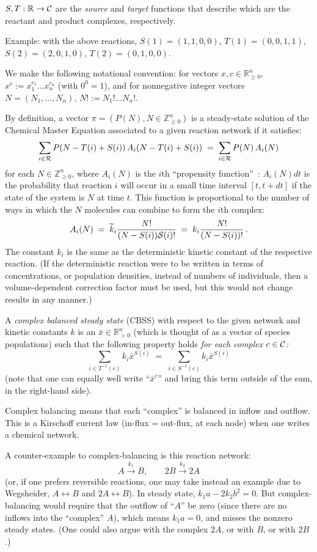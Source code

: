 \documentclass[11pt]{article}
\newcommand{\be}[1]{\begin{equation}\label{#1}}
\newcommand{\ee}{\end{equation}}
\newcommand{\arrowchem}[1]{\xrightarrow{#1}}
\newcommand{\R}{{\mathbb R}}  %
\newcommand{\Z}{{\mathbb Z}}  %
\begin{document}
$S,T: \R\rightarrow {\cal C}$ are the \emph{source} and \emph{target} functions that describe
which are the reactant and product complexes, respectively.

Example: with the above reactions, 
$S(1)=(1,1,0,0)$,
$T(1)=(0,0,1,1)$,
$S(2)=(2,0,1,0)$,
$T(2)=(0,1,0,0)$.

We make the following notational convention:
for vectors $x,c\in \R^n_{\geq 0}$, $x^c:=x_1^{c_1}\ldots x_n^{c_n}$
(with $0^0=1$), and for nonnegative integer vectors
$N=(N_1,\ldots ,N_n)$, $N!:=N_1! \ldots  N_n!$.

By definition, a vector $\pi  = (P(N), N\in \Z_{\geq 0}^n)$ is a steady-state solution
of the Chemical Master Equation associated to a given reaction network
if it satisfies: 
\be{eqn:cme}
\sum_{i\in {\cal R}} P(N-T(i)+S(i)) \,A_i(N-T(i)+S(i))
\;=\;
\sum_{i\in {\cal R}} P(N) \,A_i(N)
\ee
for each $N\in \Z^n_{\geq 0}$,
where $A_i(N)$ is the $i$th ``propensity function''~\cite{gil00}: 
$A_i(N)dt$ is the probability that
reaction $i$ will occur in a small time interval $[t,t+dt]$ if the
state of the system is $N$ at time $t$.
This function is proportional to the number of ways in which the $N$ molecules
can combine to form the $i$th complex:
\[
A_i(N) \;=\; \widetilde k_i \frac{N!}{(N-S(i)){\cal S}(i)!} \;=\;
k_i \frac{N!}{(N-S(i))!} \,.
\]
The constant $k_i$ is the same as the deterministic kinetic constant
of the respective reaction.
(If the deterministic reaction were to be written in terms of concentrations, or
population densities, instead of numbers of individuals, then a
volume-dependent correction factor must be used, but this would not change
results in any manner.)


A \emph{complex balanced steady state} (CBSS) with respect to the given
network and kinetic constants $k$ is an $\bar x\in \R^n_{>0}$
(which is thought of as a vector of
species populations) such that
the following property holds \emph{for each complex $c\in {\cal C}$:}
\be{eqn:1}
\sum_{i\in T^{-1}(c)} k_i {\bar x}^{S(i)}
\;=\;
\sum_{i\in S^{-1}(c)} k_i {\bar x}^{S(i)}
\ee
(note that one can equally well write ``${\bar x}^{c}$'' and bring this term
outside of the sum, in the right-hand side).

Complex balancing means that each ``complex'' is balanced in inflow and
outflow.  This is a Kirschoff current law (in-flux = out-flux, at each node)
when one writes a chemical network.

A counter-example to complex-balancing is this reaction network:
\[
    A \arrowchem{k_1} B , \quad\quad 2B \arrowchem{k_2} 2A
\]
(or, if one prefers reversible reactions, one may take instead
an example due to Wegsheider, $A\leftrightarrow B$ and $2A \leftrightarrow B$).
In steady state, $k_1a - 2k_2b^2 = 0$.  But complex-balancing would require that
the outflow of ``$A$'' be zero (since there are no inflows into the
``complex''  $A$), which means $k_1a = 0$, and misses the nonzero steady
states.  (One could also argue with the complex $2A$, or with
$B$, or with $2B$.) 
\end{document}
